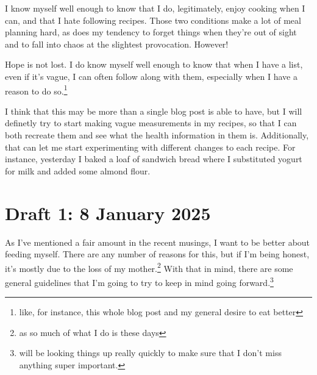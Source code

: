 \documentclass[12pt]{article}[titlepage]
\renewcommand{\,}{\textsuperscript{,}}
\begin{document}
I know myself well enough to know that I do, legitimately, enjoy cooking when I can, and that I hate following recipes.  
Those two conditions make a lot of meal planning hard, as does my tendency to forget things when they're out of sight and to fall into chaos at the slightest provocation.  
However!   


Hope is not lost.  
I do know myself well enough to know that when I have a list, even if it's vague, I can often follow along with them, especially when I have a reason to do so.\footnote{like, for instance, this whole blog post and my general desire to eat better}

I think that this may be more than a single blog post is able to have, but I will definetly try to start making vague measurements in my recipes, so that I can both recreate them and see what the health information in them is. Additionally, that can let me start experimenting with different changes to each recipe.  
For instance, yesterday I baked a loaf of sandwich bread where I substituted yogurt for milk and added some almond flour.  


\section{Draft 1: 8 January 2025}  


As I've mentioned a fair amount in the recent musings, I want to be better about feeding myself.  
There are any number of reasons for this, but if I'm being honest, it's mostly due to the loss of my mother.\footnote{as so much of what I do is these days}  
With that in mind, there are some general guidelines that I'm going to try to keep in mind going forward.\footnote{will be looking things up really quickly to make sure that I don't miss anything super important.}
\end{document}
